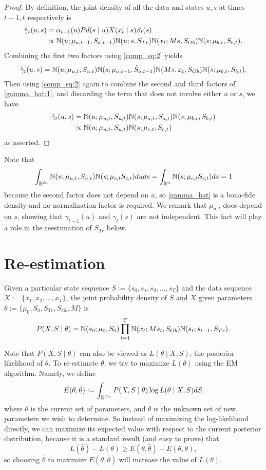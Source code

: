 \documentclass[12pt,leqno]{article}
\begin{document}
\begin{proof}
  By definition, the joint density of all the data and states $u,s$ at times $t-1,t$ respectively is 
  \begin{align*}
    \hat{\gamma}_t(u,s) &= \alpha_{t-1}(u)Pd(s\mid u)X(x_t\mid s)\beta_t(s) \\
    &\propto {\mathbb N}(u;\mu_{a,t-1},S_{a,t-1}){\mathbb N}(u;s,S_{Tr}){\mathbb N}(x_t;Ms,S_{Ob}){\mathbb N}(s;\mu_{b,t},S_{b,t}).
  \end{align*}
  Combining the first two factors using \eqref{comp_sq:2} yields
  \begin{equation}\label{gamma_hat:1}
    \hat{\gamma}_t(u,s) = {\mathbb N}(u;\mu_{u,t},S_{u,t}){\mathbb N}(s;\mu_{a,t-1},\hat{S}_{a,t-1}){\mathbb N}(Ms,x_t,S_{Ob}){\mathbb N}(s;\mu_{b,t},S_{b,t}).
  \end{equation}
  Then using \eqref{comp_sq:2} again to combine the second and third factors of \eqref{gamma_hat:1}, and discarding
  the term that does not involve either $u$ or $s$, we have
    \begin{align*}
      \hat{\gamma}_t(u,s) &= {\mathbb N}(u;\mu_{u,t},S_{u,t}){\mathbb N}(s;\mu_{a,t},S_{a,t}){\mathbb N}(s;\mu_{b,t},S_{b,t})\\
      &\propto {\mathbb N}(u;\mu_{u,t},S_{u,t}){\mathbb N}(s;\mu_{c,t},S_{c,t})
    \end{align*}
    as asserted.
    \end{proof}
  Note that
  $$
  \int_{{\mathbb R}^{2n}}{\mathbb N}(u;\mu_{u,t},S_{u,t}){\mathbb N}(s;\mu_{c,t}S_{c,t})duds = \int_{{\mathbb R}^n}{\mathbb N}(s;\mu_{c,t}S_{c,t})ds = 1 
  $$
  because the second factor does not depend on $u$, so \eqref{gamma_hat} is a bona-fide density and no
  normalization factor is required.  We remark that $\mu_{u,t}$ does depend on $s$, showing that $\gamma_{t-1}(u)$
  and $\gamma_t(s)$ are not independent.  This fact will play a role in the reestimation of $S_{Tr}$ below.
  
\section{Re-estimation}
Given a particular state sequence $S := \{s_0,s_1,s_2,\dots,s_T\}$ and the data sequence $X := \{x_1,x_2,\dots,x_T\}$,
the joint probability density of $S$ and $X$ given parameters $\theta := \{\mu_0,S_0,S_{Tr},S_{Ob},M\}$ is
$$
P(X,S\mid\theta) = {\mathbb N}(s_0;\mu_0,S_0)\prod_{t=1}^T{\mathbb N}(x_t;Ms_t,S_{Ob}){\mathbb N}(s_t;s_{t-1},S_{Tr}).
$$

Note that $P(X,S\mid\theta)$ can also be viewed as  $L(\theta\mid X,S)$, the posterior likelihood of $\theta$.
To re-estimate $\theta$, we try to maximize $L(\theta)$ using the EM algorithm. Namely, we define 
$$
E(\theta,\bar{\theta}) := \int_{{\mathbb R}^{Tn}}P(X,S\mid\theta)\log{L(\bar{\theta}\mid X,S)}dS,
$$
where $\theta$ is the current set of parameters, and $\bar{\theta}$ is the unknown set of new parameters
we wish to determine. So instead of maximizing the log-likelihood directly, we can maximize its expected
value with respect to the current posterior distribution, because it is a standard result (and easy to prove) that
$$
L(\bar{\theta}) - L(\theta) \ge E(\theta,\bar{\theta}) - E(\theta,\theta),
$$
so choosing $\bar{\theta}$ to maximize $E(\theta,\bar{\theta})$ will increase the value of $L(\theta)$.
\end{document}

